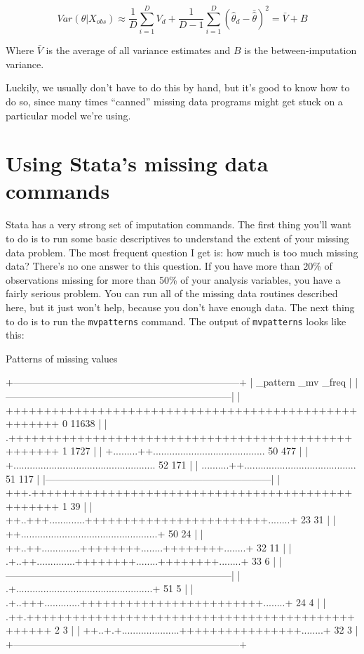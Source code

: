 \documentclass[12 pt]{article}
\begin{document}
\begin{equation*}
  Var(\theta|X_{obs})\approx
  \frac{1}{D}\sum_{i=1}^{D}V_d+\frac{1}{D-1}\sum_{i=1}^{D}(\hat{\theta}_d-\bar{\hat{\theta}})^2= \bar{V}+B
\end{equation*}

Where $\bar{V}$  is the average of all variance estimates and $B$ is
the between-imputation variance. 

Luckily, we usually don't have to do this by hand, but it's good to
know how to do so, since many times ``canned'' missing data programs
might get stuck on a particular model we're using.

\section{Using Stata's missing data commands}

Stata has a very strong set of imputation commands. The first thing
you'll want to do is to run some basic descriptives to understand the
extent of your missing data problem. The most frequent question I get
is: how much is too much missing data? There's no one answer to this
question. If you have more than 20\% of observations missing for more
than 50\% of your analysis variables, you have a fairly serious
problem. You can run all of the missing data routines described here,
but it just won't help, because you don't have enough data. The next
thing to do is to run the \texttt{mvpatterns} command. The output of
\texttt{mvpatterns} looks like this:

\begin{stlog}
  
Patterns of missing values

  +---------------------------------------------------------------------+
  |                                              _pattern   _mv   _freq |
  |---------------------------------------------------------------------|
  | +++++++++++++++++++++++++++++++++++++++++++++++++++++     0   11638 |
  | .++++++++++++++++++++++++++++++++++++++++++++++++++++     1    1727 |
  | +.........++.........................................    50     477 |
  | +....................................................    52     171 |
  | ..........++.........................................    51     117 |
  |---------------------------------------------------------------------|
  | +++.+++++++++++++++++++++++++++++++++++++++++++++++++     1      39 |
  | ++..+++.............++++++++++++++++++++++++........+    23      31 |
  | ++..................................................+    50      24 |
  | ++..++..............++++++++........++++++++........+    32      11 |
  | .+..++..............++++++++........++++++++........+    33       6 |
  |---------------------------------------------------------------------|
  | .+..................................................+    51       5 |
  | .+..+++.............++++++++++++++++++++++++........+    24       4 |
  | .++.+++++++++++++++++++++++++++++++++++++++++++++++++     2       3 |
  | ++..+.+.....................++++++++++++++++........+    32       3 |
  +---------------------------------------------------------------------+

\end{stlog}
\end{document}
